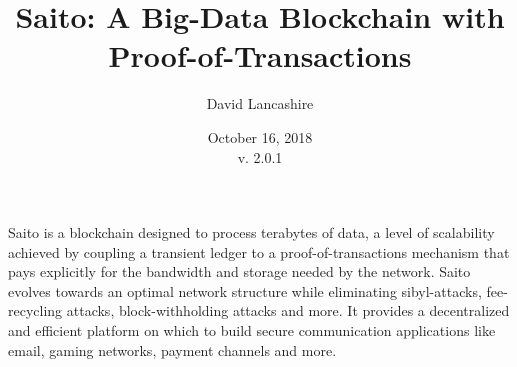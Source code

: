 \documentclass[11.5pt, oneside]{article}   	%
\title{Saito: A Big-Data Blockchain with Proof-of-Transactions}
\author{David Lancashire}
\date{October 16, 2018\\v. 2.0.1}
\begin{document}
\maketitle



\begin{onecolabstract}
Saito is a blockchain designed to process terabytes of data, a level of scalability achieved by coupling a transient ledger to a proof-of-transactions mechanism that pays explicitly for the bandwidth and storage needed by the network. Saito evolves towards an optimal network structure while eliminating sibyl-attacks, fee-recycling attacks, block-withholding attacks and more. It provides a decentralized and efficient platform on which to build secure communication applications like email, gaming networks, payment channels and more.
\end{onecolabstract}
\end{document}
